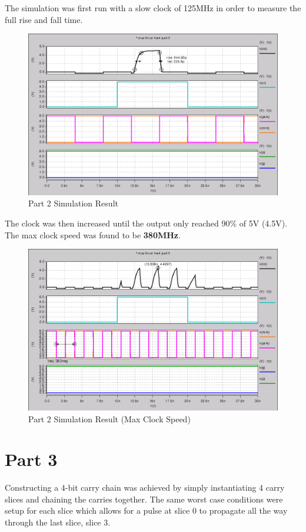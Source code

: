 \documentclass{article}
\begin{document}


\newpage
The simulation was first run with a slow clock of 125MHz in order to measure
the full rise and fall time.

\begin{figure}[H]
    \centering
    \includegraphics[width=0.8\linewidth]{../part_2.png}
    \caption{Part 2 Simulation Result}
\end{figure}

The clock was then increased until the output only reached 90\% of 5V (4.5V).
The max clock speed was found to be \textbf{380MHz}.

\begin{figure}[H]
    \centering
    \includegraphics[width=0.8\linewidth]{../part_2_fast.png}
    \caption{Part 2 Simulation Result (Max Clock Speed)}
\end{figure}

\newpage
\section*{Part 3}

Constructing a 4-bit carry chain was achieved by simply instantiating 4 carry
slices and chaining the carries together. The same worst case conditions were
setup for each slice which allows for a pulse at slice 0 to propagate all the
way through the last slice, slice 3.
\end{document}
